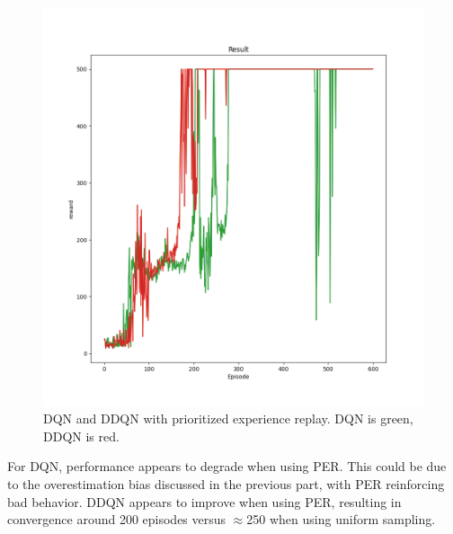 \documentclass[10pt]{article}
\begin{document}
\begin{figure}[h!]
    \centering
    \includegraphics[scale=0.5]{per_ddqn_red_dqn_green.png}
    \caption{DQN and DDQN with prioritized experience replay. DQN is green, DDQN is red.}
\end{figure}

For DQN, performance appears to degrade when using PER. This could be due to the overestimation bias discussed in the previous part, with PER reinforcing bad behavior. DDQN appears to improve when using PER, resulting in convergence around 200 episodes versus $\approx$250 when using uniform sampling. 




\noindent \underline{\hspace{3in}}\\
\end{document}
